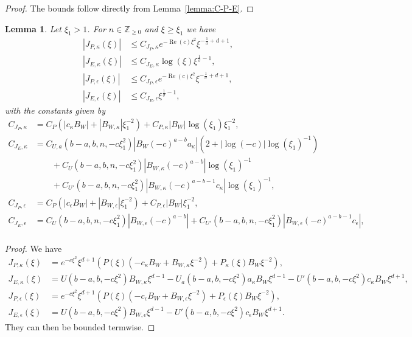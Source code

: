 \documentclass[11pt]{article}
\DeclareMathOperator{\real}{Re}
\newtheorem{lemma}[definition]{Lemma}
\begin{document}
\begin{proof}
  The bounds follow directly from Lemma~\ref{lemma:C-P-E}.
\end{proof}

\begin{lemma}\label{lemma:C-J-P-kappa-J-E-kappa}
  Let \(\xi_{1} > 1\). For \(n \in \mathbb{Z}_{\geq 0}\) and
  \(\xi \geq \xi_{1}\) we have
  \begin{align*}
    |J_{P,\kappa}(\xi)| &\leq C_{J_{P},\kappa}e^{-\real(c)\xi^{2}}\xi^{-\frac{1}{\sigma} + d + 1},\\
    |J_{E,\kappa}(\xi)| &\leq C_{J_{E},\kappa}\log(\xi)\xi^{\frac{1}{\sigma} - 1},\\
    |J_{P,\epsilon}(\xi)| &\leq C_{J_{P},\epsilon}e^{-\real(c)\xi^{2}}\xi^{-\frac{1}{\sigma} + d + 1},\\
    |J_{E,\epsilon}(\xi)| &\leq C_{J_{E},\epsilon}\xi^{\frac{1}{\sigma} - 1},
  \end{align*}
  with the constants given by
  \begin{align*}
    C_{J_{P},\kappa}
    &= C_{P}(
      |c_{\kappa}B_{W}| + |B_{W,\kappa}|\xi_{1}^{-2}
      )
      + C_{P,\kappa}|B_{W}|\log(\xi_{1})\xi_{1}^{-2}
      ,\\
    C_{J_{E},\kappa}
    &= C_{U,a}(b - a, b, n, -c\xi_{1}^{2})|B_{W}(-c)^{a - b}a_{\kappa}|(2 + |\log(-c)|\log(\xi_{1})^{-1})\\
    &\qquad+ C_{U}(b - a, b, n, -c\xi_{1}^{2})|B_{W,\kappa}(-c)^{a - b}|\log(\xi_{1})^{-1}\\
    &\qquad+ C_{U'}(b - a, b, n, -c\xi_{1}^{2})|B_{W,\kappa}(-c)^{a - b - 1}c_{\kappa}|\log(\xi_{1})^{-1},\\
    C_{J_{P},\epsilon}
    &= C_{P}(
      |c_{\epsilon}B_{W}| + |B_{W,\epsilon}|\xi_{1}^{-2}
      )
      + C_{P,\epsilon}|B_{W}|\xi_{1}^{-2}
      ,\\
    C_{J_{E},\epsilon}
    &= C_{U}(b - a, b, n, -c\xi_{1}^{2})|B_{W,\epsilon}(-c)^{a - b}|
      + C_{U'}(b - a, b, n, -c\xi_{1}^{2})|B_{W,\epsilon}(-c)^{a - b - 1}c_{\epsilon}|,\\
  \end{align*}
\end{lemma}

\begin{proof}
  We have
  \begin{align*}
    J_{P,\kappa}(\xi)
    &= e^{-c\xi^{2}}\xi^{d + 1}(
      P(\xi)(-c_{\kappa}B_{W} + B_{W,\kappa}\xi^{-2})
      + P_{\kappa}(\xi)B_{W}\xi^{-2}
      ),\\
    J_{E,\kappa}(\xi)
    &= U(b - a, b, -c\xi^{2})B_{W,\kappa}\xi^{d - 1}
      - U_{a}(b - a, b, -c\xi^{2})a_{\kappa}B_{W}\xi^{d - 1}
      - U'(b - a, b, -c\xi^{2})c_{\kappa}B_{W}\xi^{d + 1},\\
    J_{P,\epsilon}(\xi)
    &= e^{-c\xi^{2}}\xi^{d + 1}(
      P(\xi)(-c_{\epsilon}B_{W} + B_{W,\epsilon}\xi^{-2})
      + P_{\epsilon}(\xi)B_{W}\xi^{-2}
      ),\\
    J_{E,\epsilon}(\xi)
    &= U(b - a, b, -c\xi^{2})B_{W,\epsilon}\xi^{d - 1}
      - U'(b - a, b, -c\xi^{2})c_{\epsilon}B_{W}\xi^{d + 1}.
  \end{align*}
  They can then be bounded termwise.
\end{proof}
\end{document}
